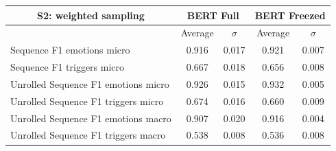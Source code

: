 \documentclass[11pt,table,xcdraw]{article}
\begin{document}
\begin{table}[h]
\bigskip
\begin{tabular}{|l|cc|cc|}
\hline
\multicolumn{1}{|c|}{\textbf{S2: weighted sampling}}              & \multicolumn{2}{c|}{BERT Full}                                                     & \multicolumn{2}{c|}{BERT Freezed}                                                  \\ \hline
\multicolumn{1}{|c|}{}              & \multicolumn{1}{c|}{Average}                       & $\sigma$                         & \multicolumn{1}{c|}{Average}                       & $\sigma$                         \\ \hline
Sequence F1 emotions micro          & \multicolumn{1}{c|}{\cellcolor[HTML]{009901}0.916} & \cellcolor[HTML]{FFFFFF}0.017 & \multicolumn{1}{c|}{\cellcolor[HTML]{009901}0.921} & \cellcolor[HTML]{FFFFFF}0.007 \\ \hline
Sequence F1 triggers micro          & \multicolumn{1}{c|}{\cellcolor[HTML]{D3F008}0.667} & \cellcolor[HTML]{FFFFFF}0.018 & \multicolumn{1}{c|}{\cellcolor[HTML]{D3F008}0.656} & \cellcolor[HTML]{FFFFFF}0.008 \\ \hline
Unrolled Sequence F1 emotions micro & \multicolumn{1}{c|}{\cellcolor[HTML]{009901}0.926} & \cellcolor[HTML]{FFFFFF}0.015 & \multicolumn{1}{c|}{\cellcolor[HTML]{009901}0.932} & \cellcolor[HTML]{FFFFFF}0.005 \\ \hline
Unrolled Sequence F1 triggers micro & \multicolumn{1}{c|}{\cellcolor[HTML]{D3F008}0.674} & \cellcolor[HTML]{FFFFFF}0.016 & \multicolumn{1}{c|}{\cellcolor[HTML]{D3F008}0.660} & \cellcolor[HTML]{FFFFFF}0.009 \\ \hline
Unrolled Sequence F1 emotions macro & \multicolumn{1}{c|}{\cellcolor[HTML]{009901}0.907} & \cellcolor[HTML]{FFFFFF}0.020 & \multicolumn{1}{c|}{\cellcolor[HTML]{009901}0.916} & \cellcolor[HTML]{FFFFFF}0.004 \\ \hline
Unrolled Sequence F1 triggers macro & \multicolumn{1}{c|}{\cellcolor[HTML]{F8A102}0.538} & \cellcolor[HTML]{FFFFFF}0.008 & \multicolumn{1}{c|}{\cellcolor[HTML]{F8A102}0.536} & \cellcolor[HTML]{FFFFFF}0.008 \\ \hline
\end{tabular}


\end{table}
\end{document}
